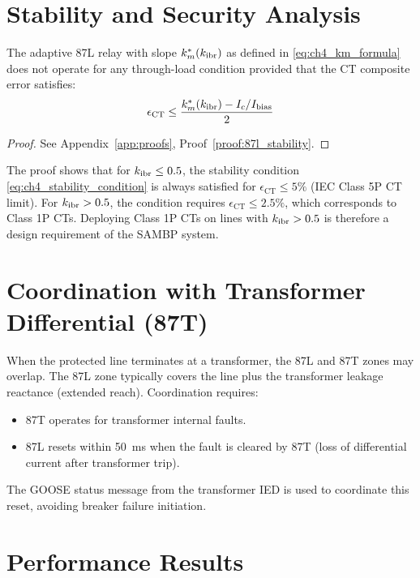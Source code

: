 \section{Stability and Security Analysis}
\label{sec:ch4_stability}

\begin{proposition}
\label{prop:ch4_stability}
The adaptive 87L relay with slope $k_m^\ast(k_{\mathrm{ibr}})$ as defined in
\eqref{eq:ch4_km_formula} does not operate for any through-load condition
provided that the CT composite error satisfies:
\begin{equation}
  \epsilon_\mathrm{CT} \leq \frac{k_m^\ast(k_{\mathrm{ibr}}) - I_c/I_\mathrm{bias}}{2}
  \label{eq:ch4_stability_condition}
\end{equation}
\end{proposition}

\begin{proof}
See Appendix~\ref{app:proofs}, Proof~\ref{proof:87l_stability}.
\end{proof}

The proof shows that for $k_{\mathrm{ibr}} \leq 0.5$, the stability condition
\eqref{eq:ch4_stability_condition} is always satisfied for
$\epsilon_\mathrm{CT} \leq 5\%$ (IEC Class 5P CT limit). For
$k_{\mathrm{ibr}} > 0.5$, the condition requires $\epsilon_\mathrm{CT} \leq 2.5\%$,
which corresponds to Class 1P CTs. Deploying Class 1P CTs on lines with
$k_{\mathrm{ibr}} > 0.5$ is therefore a design requirement of the SAMBP system.

\section{Coordination with Transformer Differential (87T)}
\label{sec:ch4_87t_coord}

When the protected line terminates at a transformer, the 87L and 87T zones
may overlap. The 87L zone typically covers the line plus the transformer
leakage reactance (extended reach). Coordination requires:
\begin{itemize}
\item 87T operates for transformer internal faults.
\item 87L resets within 50~ms when the fault is cleared by 87T
  (loss of differential current after transformer trip).
\end{itemize}
The GOOSE status message from the transformer IED is used to coordinate
this reset, avoiding breaker failure initiation.

\section{Performance Results}
\label{sec:ch4_results}

